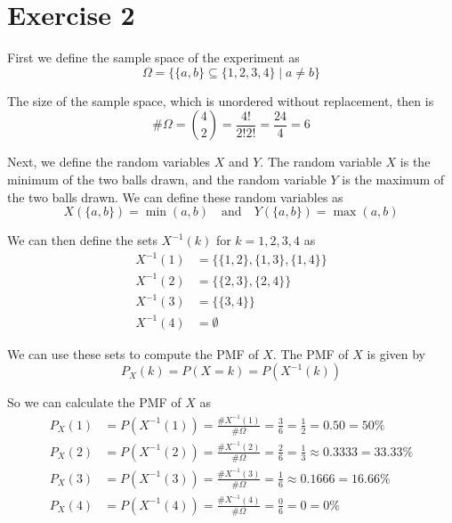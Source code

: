 \section{Exercise 2}

First we define the sample space of the experiment as
\[
	\Omega = \{ \{a, b\} \subseteq \{1, 2, 3, 4\} \mid a \neq b \}
\]

The size of the sample space, which is unordered without replacement, then is
\[
	\# \Omega = \binom{4}{2} = \frac{4!}{2!2!} = \frac{24}{4} = 6
\]

Next, we define the random variables $X$ and $Y$. The random variable $X$ is the minimum of the two balls drawn, and the random variable $Y$ is the maximum of the two balls drawn. We can define these random variables as
\[
	X(\{a, b\}) = \min(a, b) \quad \text{and} \quad Y(\{a, b\}) = \max(a, b)
\]

We can then define the sets $X^{-1}(k)$ for $k = 1, 2, 3, 4$ as
\begin{align*}
	X^{-1}(1) & = \{ \{1, 2\}, \{1, 3\}, \{1, 4\} \} \\
	X^{-1}(2) & = \{ \{2, 3\}, \{2, 4\} \}           \\
	X^{-1}(3) & = \{ \{3, 4\} \}                     \\
	X^{-1}(4) & = \emptyset
\end{align*}

We can use these sets to compute the PMF of $X$. The PMF of $X$ is given by
\[
	P_X(k) = P(X = k) = P(X^{-1}(k))
\]

So we can calculate the PMF of $X$ as
\begin{align*}
	P_X(1) & = P(X^{-1}(1)) = \frac{\# X^{-1}(1)}{\# \Omega} = \frac{3}{6} = \frac{1}{2} = 0.50 = 50\%            \\
	P_X(2) & = P(X^{-1}(2)) = \frac{\# X^{-1}(2)}{\# \Omega} = \frac{2}{6} = \frac{1}{3} \approx 0.3333 = 33.33\% \\
	P_X(3) & = P(X^{-1}(3)) = \frac{\# X^{-1}(3)}{\# \Omega} = \frac{1}{6} \approx 0.1666 = 16.66\%               \\
	P_X(4) & = P(X^{-1}(4)) = \frac{\# X^{-1}(4)}{\# \Omega} = \frac{0}{6} = 0 = 0\%
\end{align*}

